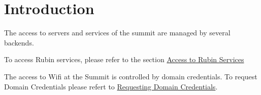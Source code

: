 \section{Introduction}

The access to servers and services of the summit are managed by several backends.

To access Rubin services, please refer to the section \hyperref[sec:RubinServices]{Access to Rubin Services}

The access to Wifi at the Summit is controlled by domain credentials. To request Domain Credentials please refert to \hyperref[sec:Domain]{Requesting Domain Credentials}.